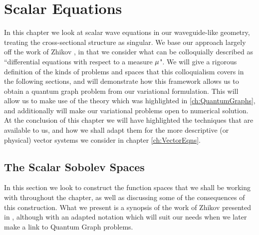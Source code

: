 \chapter{Scalar Equations} \label{ch:ScalarEqns}
In this chapter we look at scalar wave equations in our waveguide-like geometry, treating the cross-sectional structure as singular.
We base our approach largely off the work of Zhikov \cite{zhikov2000extension}, in that we consider what can be colloquially described as ``differential equations with respect to a measure $\mu$".
We will give a rigorous definition of the kinds of problems and spaces that this colloquialism covers in the following sections, and will demonstrate how this framework allows us to obtain a quantum graph problem from our variational formulation.
This will allow us to make use of the theory which was highlighted in \ref{ch:QuantumGraphs}, and additionally will make our variational problems open to numerical solution.
At the conclusion of this chapter we will have highlighted the techniques that are available to us, and how we shall adapt them for the more descriptive (or physical) vector systems we consider in chapter \ref{ch:VectorEqns}.

\section{The Scalar Sobolev Spaces} \label{sec:ScalarSobSpaces}
In this section we look to construct the function spaces that we shall be working with throughout the chapter, as well as discussing some of the consequences of this construction.
What we present is a synopsis of the work of Zhikov presented in \cite{zhikov2000extension}, although with an adapted notation which will suit our needs when we later make a link to Quantum Graph problems. \newline


